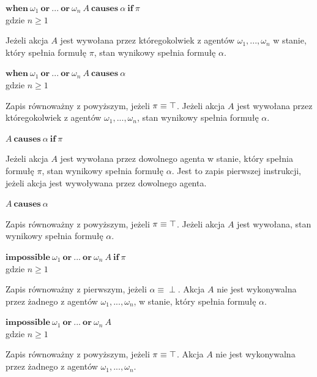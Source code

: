 \documentclass[11pt,a4paper]{article}
\def\tang{\ThisStyle{\abovebaseline[0pt]{\scalebox{-1}{$\SavedStyle\perp$}}}}
\begin{document}
    \begin{center}
        $\mathbf{when}~\omega_1~\mathbf{or}~...~\mathbf{or}~\omega_n~A~\mathbf{causes}~\alpha~\mathbf{if}~\pi$
        \\gdzie $n \geq 1$
    \end{center}
    Jeżeli akcja $A$ jest wywołana przez któregokolwiek z agentów $\omega_1, ..., \omega_n$ w stanie, który spełnia formułę $\pi$, stan wynikowy spełnia formułę $\alpha$.
    
    \begin{center}
        $\mathbf{when}~\omega_1~\mathbf{or}~...~\mathbf{or}~\omega_n~A~\mathbf{causes}~\alpha$
        \\gdzie $n \geq 1$
    \end{center}
    Zapis równoważny z powyższym, jeżeli $\pi \equiv \tang$. Jeżeli akcja $A$ jest wywołana przez któregokolwiek z agentów $\omega_1, ..., \omega_n$, stan wynikowy spełnia formułę $\alpha$.
    
    \begin{center}
        $A~\mathbf{causes}~\alpha~\mathbf{if}~\pi$    
    \end{center}
    Jeżeli akcja $A$ jest wywołana przez dowolnego agenta w stanie, który spełnia formułę $\pi$, stan wynikowy spełnia formułę $\alpha$. Jest to zapis pierwszej instrukcji, jeżeli akcja jest wywoływana przez dowolnego agenta.
    
    \begin{center}
        $A~\mathbf{causes}~\alpha$
    \end{center}
    Zapis równoważny z powyższym, jeżeli $\pi \equiv \tang$. Jeżeli akcja $A$ jest wywołana, stan wynikowy spełnia formułę $\alpha$.
    
    \begin{center}
        $\mathbf{impossible}~\omega_1~\mathbf{or}~...~\mathbf{or}~\omega_n~A~\mathbf{if}~\pi$
        \\gdzie $n \geq 1$
    \end{center}
    Zapis równoważny z pierwszym, jeżeli $\alpha \equiv \perp$. Akcja $A$ nie jest wykonywalna przez żadnego z agentów $\omega_1, ..., \omega_n$, w stanie, który spełnia formułę $\alpha$. 
    
    \begin{center}
        $\mathbf{impossible}~\omega_1~\mathbf{or}~...~\mathbf{or}~\omega_n~A$
        \\gdzie $n \geq 1$
    \end{center}
    Zapis równoważny z powyższym, jeżeli $\pi \equiv \tang$. Akcja $A$ nie jest wykonywalna przez żadnego z agentów $\omega_1, ..., \omega_n$.
    
\end{document}
